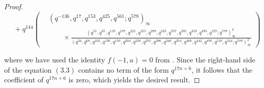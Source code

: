 \documentclass[11pt,a4paper]{article}
\numberwithin{equation}{section}
\theoremstyle{plain}
\begin{document}
\begin{proof}
	\[
	\quad +q^{144}\left(
	\begin{aligned}
		&(q^{-136}, q^{17}, q^{153}, q^{425}, q^{561}; q^{578})_{\infty} \\
		&\qquad \times
		\frac{(q^{51}, q^{85}, q^{119}, q^{187}, q^{221}, q^{255}, q^{289}, q^{323}, q^{357}, q^{391}, q^{459}, q^{493}, q^{527}; q^{578})_{\infty}^{2}}{(q^{34}, q^{68}, q^{102}, q^{136}, q^{170}, q^{204}, q^{238}, q^{272}, q^{306}, q^{340}, q^{374}, q^{408}, q^{442}, q^{476}, q^{510}, q^{544}; q^{578})_{\infty}^{2}} 
	\end{aligned}
	\right)
	\tag{3.3}
	\]
	

	where we have used the identity $f(-1,a)=0$ from \cite[pp.~34, Entry 18(iii)]{Berndt}. 
	Since the right-hand side of the equation ${(3.3)}$ contains no term of the form $q^{17n+6}$, it follows that the coefficient of $q^{17n+6}$ is zero, which yields the desired result.
	\end{proof}
	
\end{document}
